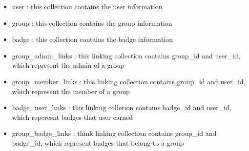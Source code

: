 \begin{itemize}
\item user : this collection contains the user information
\item group : this collection contains the group information  
\item badge : this collection contains the badge information
\item group{\_}admin{\_}links : this linking collection contains group{\_}id and user{\_}id, which represent the admin of a group
\item group{\_}member{\_}links : this linking collection contains group{\_}id and user{\_}id, which represent the member of a group
\item badge{\_}user{\_}links : this linking colletion contains badge{\_}id and user{\_}id, which reperesnt badges that user earned
\item group{\_}badge{\_}links : think linking collection contains group{\_}id and badge{\_}id, which represent badges that belong to a group
\end{itemize}





